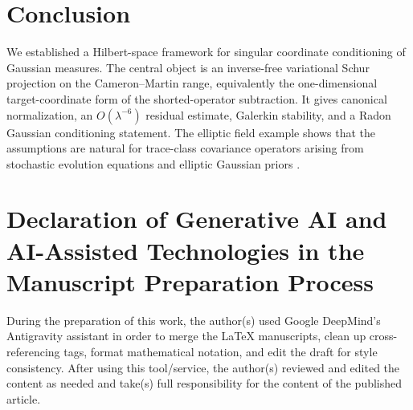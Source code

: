 \documentclass[11pt]{amsart}
\theoremstyle{plain}
\theoremstyle{definition}
\theoremstyle{remark}
\begin{document}
\section{Conclusion}
\label{sec:conclusion}

We established a Hilbert-space framework for singular coordinate conditioning of Gaussian measures. The central object is an inverse-free variational Schur projection on the Cameron--Martin range, equivalently the one-dimensional target-coordinate form of the shorted-operator subtraction. It gives canonical normalization, an $O(\lambda^{-6})$ residual estimate, Galerkin stability, and a Radon Gaussian conditioning statement. The elliptic field example shows that the assumptions are natural for trace-class covariance operators arising from stochastic evolution equations and elliptic Gaussian priors \cite{daprato2014stochastic,lord2014introduction,stuart2010inverse}.

\section*{Declaration of Generative AI and AI-Assisted Technologies in the Manuscript Preparation Process}

During the preparation of this work, the author(s) used Google DeepMind's Antigravity assistant in order to merge the LaTeX manuscripts, clean up cross-referencing tags, format mathematical notation, and edit the draft for style consistency. After using this tool/service, the author(s) reviewed and edited the content as needed and take(s) full responsibility for the content of the published article.




\appendix


\end{document}
